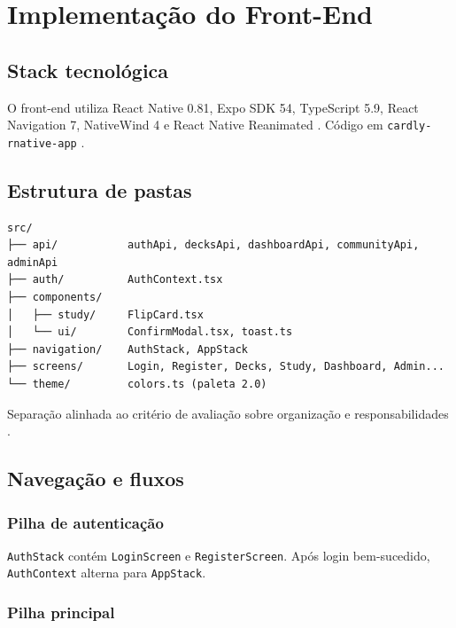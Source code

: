 \chapter{Implementação do Front-End}
\label{cap:frontend}

\section{Stack tecnológica}

O front-end utiliza React Native 0.81, Expo SDK 54, TypeScript 5.9, React Navigation 7, NativeWind 4 e React Native Reanimated \cite{react_native_docs,expo_docs,typescript_handbook,nativewind_docs,reanimated_docs}. Código em \texttt{cardly-rnative-app} \cite{cardly_frontend_repo}.

\section{Estrutura de pastas}

\begin{verbatim}
src/
├── api/           authApi, decksApi, dashboardApi, communityApi, adminApi
├── auth/          AuthContext.tsx
├── components/
│   ├── study/     FlipCard.tsx
│   └── ui/        ConfirmModal.tsx, toast.ts
├── navigation/    AuthStack, AppStack
├── screens/       Login, Register, Decks, Study, Dashboard, Admin...
└── theme/         colors.ts (paleta 2.0)
\end{verbatim}

Separação alinhada ao critério de avaliação sobre organização e responsabilidades \cite{clean_architecture_martin,react_hooks_docs}.

\section{Navegação e fluxos}

\subsection{Pilha de autenticação}

\texttt{AuthStack} contém \texttt{LoginScreen} e \texttt{RegisterScreen}. Após login bem-sucedido, \texttt{AuthContext} alterna para \texttt{AppStack}.

\subsection{Pilha principal}

